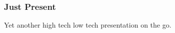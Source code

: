 \documentclass[12pt,hyperref=true,mathserif]{beamer}
\begin{document}
\begin{frame}
  \frametitle{Just Present}
  Yet another high tech low tech presentation on the go.
\end{frame}
\end{document}
